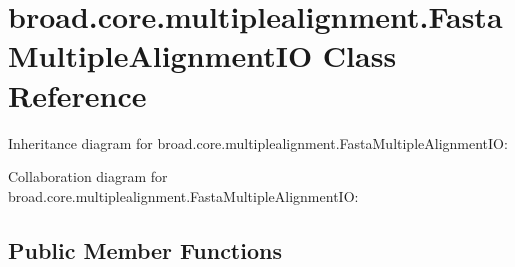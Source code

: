 \hypertarget{classbroad_1_1core_1_1multiplealignment_1_1_fasta_multiple_alignment_i_o}{\section{broad.\+core.\+multiplealignment.\+Fasta\+Multiple\+Alignment\+I\+O Class Reference}
\label{classbroad_1_1core_1_1multiplealignment_1_1_fasta_multiple_alignment_i_o}
}


Inheritance diagram for broad.\+core.\+multiplealignment.\+Fasta\+Multiple\+Alignment\+I\+O\+:


Collaboration diagram for broad.\+core.\+multiplealignment.\+Fasta\+Multiple\+Alignment\+I\+O\+:
\subsection*{Public Member Functions}

